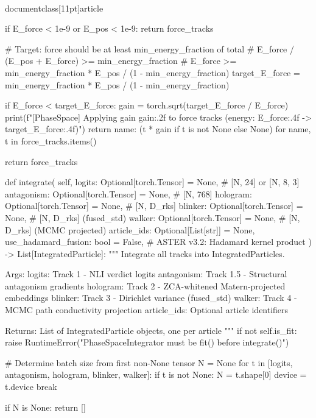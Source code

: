 \\documentclass[11pt]{article}
\begin{document}
\begin{CodeBlock}
        if E_force < 1e-9 or E_pos < 1e-9:
            return force_tracks

        # Target: force should be at least min_energy_fraction of total
        # E_force / (E_pos + E_force) >= min_energy_fraction
        # E_force >= min_energy_fraction * E_pos / (1 - min_energy_fraction)
        target_E_force = min_energy_fraction * E_pos / (1 - min_energy_fraction)

        if E_force < target_E_force:
            gain = torch.sqrt(target_E_force / E_force)
            print(f"[PhaseSpace] Applying gain {gain:.2f} to force tracks (energy: {E_force:.4f} -> {target_E_force:.4f})")
            return {
                name: (t * gain if t is not None else None)
                for name, t in force_tracks.items()
            }

        return force_tracks

    def integrate(
        self,
        logits: Optional[torch.Tensor] = None,          # [N, 24] or [N, 8, 3]
        antagonism: Optional[torch.Tensor] = None,      # [N, 768]
        hologram: Optional[torch.Tensor] = None,        # [N, D_rks]
        blinker: Optional[torch.Tensor] = None,         # [N, D_rks] (fused_std)
        walker: Optional[torch.Tensor] = None,          # [N, D_rks] (MCMC projected)
        article_ids: Optional[List[str]] = None,
        use_hadamard_fusion: bool = False,              # ASTER v3.2: Hadamard kernel product
    ) -> List[IntegratedParticle]:
        """
        Integrate all tracks into IntegratedParticles.

        Args:
            logits: Track 1 - NLI verdict logits
            antagonism: Track 1.5 - Structural antagonism gradients
            hologram: Track 2 - ZCA-whitened Matern-projected embeddings
            blinker: Track 3 - Dirichlet variance (fused_std)
            walker: Track 4 - MCMC path conductivity projection
            article_ids: Optional article identifiers

        Returns:
            List of IntegratedParticle objects, one per article
        """
        if not self.is_fit:
            raise RuntimeError("PhaseSpaceIntegrator must be fit() before integrate()")

        # Determine batch size from first non-None tensor
        N = None
        for t in [logits, antagonism, hologram, blinker, walker]:
            if t is not None:
                N = t.shape[0]
                device = t.device
                break

        if N is None:
            return []


\end{CodeBlock}
\end{document}
